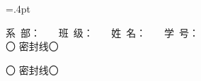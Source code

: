 \usepackage[utf8]{inputenc}

\usepackage[paperwidth=36.8cm,paperheight=26cm,
top=2cm,bottom=2cm,right=2cm,left=3.cm,
columnsep=1.5cm]{geometry}
\columnseprule=.4pt

\usepackage{bbding}
\usepackage{amsmath}
\usepackage{amsfonts}
\usepackage{amssymb}
\usepackage{wasysym}
\usepackage{makeidx}

\usepackage{graphicx}
\usepackage{setspace}
\usepackage{tabu}
\usepackage{paralist}
\usepackage{lastpage}
\usepackage{enumerate} 

\usepackage{fancyhdr}
\renewcommand{\headrulewidth}{0pt}
\pagestyle{fancy}

\newsavebox{\zdxa}%

\sbox{\zdxa}
{\parbox{27cm}{\centering \heiti \hspace{1cm}
		系~部：\underline{\makebox[30mm][c]{}}~~~ 班~级：\underline{\makebox[45mm][c]{}}~~~ 姓~名：\underline{\makebox[30mm][c]{}}~~~ 学~号：\underline{\makebox[30mm][c]{}} \\
		\vspace{1mm}
	  \dotfill{} 〇 \dotfill{} 密\dotfill{}封\dotfill{}线\dotfill{}〇\dotfill{} \\
}}
\newsavebox{\zdxb}%
\sbox{\zdxb}
{\parbox{27cm}{\centering \heiti
		\vspace{30mm}
		\vspace{1mm}
		\dotfill{} 〇 \dotfill{}密\dotfill{}封\dotfill{}线\dotfill{}〇\dotfill{} \\
}}

\newcommand{\putzdx}{
		\hspace{-1.7cm}\parbox{1cm}{\vspace{-1.5cm}
			\rotatebox[origin=c]{90}{
				\usebox{\zdxa}
		}}
}
\newcommand{\putzdxx}{
	\hspace{0.3cm}\parbox{1cm}{\vspace{-1.5cm}
		\rotatebox[origin=c]{-90}{
			\usebox{\zdxb}
	}}
}


\usepackage{ifthen}

